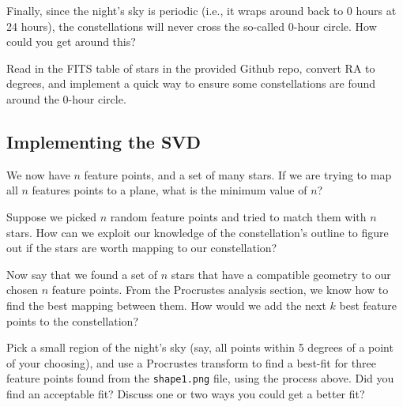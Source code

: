 \documentclass{article}
\begin{document}
Finally, since the night's sky is periodic (i.e., it wraps around back to 0 hours at 24 hours), the constellations will never cross the so-called 0-hour circle. How could you get around this?

Read in the FITS table of stars in the provided Github repo, convert RA to degrees, and implement a quick way to ensure some constellations are found around the 0-hour circle.

\subsection{Implementing the SVD}

We now have $n$ feature points, and a set of many stars. If we are trying to map all $n$ features points to a plane, what is the minimum value of $n$?

Suppose we picked $n$ random feature points and tried to match them with $n$ stars. How can we exploit our knowledge of the constellation's outline to figure out if the stars are worth mapping to our constellation?

Now say that we found a set of $n$ stars that have a compatible geometry to our chosen $n$ feature points. From the Procrustes analysis section, we know how to find the best mapping between them. How would we add the next $k$ best feature points to the constellation?

Pick a small region of the night's sky (say, all points within 5 degrees of a point of your choosing), and use a Procrustes transform to find a best-fit for three feature points found from the \texttt{shape1.png} file, using the process above. Did you find an acceptable fit? Discuss one or two ways you could get a better fit?
\end{document}
